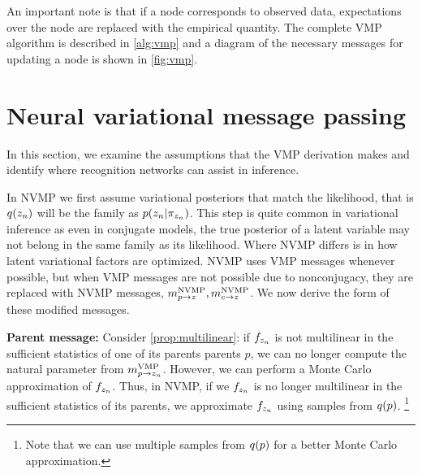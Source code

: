 An important note is that if a node corresponds to observed data,
expectations over the node are replaced with the empirical quantity.
The complete VMP algorithm is described in \autoref{alg:vmp} and
a diagram of the necessary messages for updating a node
is shown in \autoref{fig:vmp}.

\section{Neural variational message passing}
\label{sec:nvmp}

In this section, we examine
the assumptions that the VMP derivation makes
and identify where recognition networks
can assist in inference.

In NVMP we first
assume variational posteriors that match
the likelihood, that is $q(z_n)$ will
be the family as $p(z_n | \pi_{z_n})$. 
This step 
is quite common in variational inference
as even in conjugate
models, the true posterior of a latent variable may not belong
in the same family as its likelihood.
Where NVMP differs is in how latent variational factors
are optimized.
NVMP uses VMP messages whenever possible,
but when VMP messages are not possible due to 
nonconjugacy, they are replaced with NVMP messages,
$m^{\text{NVMP}}_{p \rightarrow z},m^{\text{NVMP}}_{c \rightarrow z}$.
We now derive the form of these modified messages.

\textbf{Parent message:}
Consider \autoref{prop:multilinear}:
if $f_{z_n}$ is not multilinear in the sufficient statistics of one of
its parents
parents $p$,
we can no longer compute the natural parameter
from $m^{\text{VMP}}_{p \rightarrow z_n}$.
However, we can perform a Monte Carlo approximation of $f_{z_n}$.
Thus, in NVMP, if we $f_{z_n}$ is no longer
multilinear in the sufficient statistics of its parents,
we approximate $f_{z_n}$ using samples from $q(p)$.
\footnote{Note that we can use multiple samples from $q(p)$ for a better Monte Carlo
approximation.}


